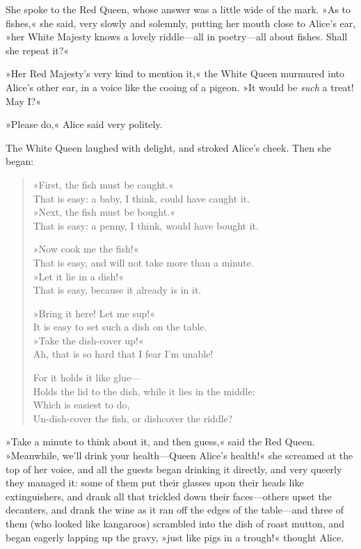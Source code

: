 She spoke to the Red Queen, whose answer was a little wide of the mark. »As to fishes,« she said, very slowly and solemnly, putting her mouth close to Alice's ear, »her White Majesty knows a lovely riddle—all in poetry—all about fishes. Shall she repeat it?«

»Her Red Majesty's very kind to mention it,« the White Queen murmured into Alice's other ear, in a voice like the cooing of a pigeon. »It would be \textit{such} a treat! May I?«

»Please do,« Alice said very politely.

The White Queen laughed with delight, and stroked Alice's cheek. Then she began:

\begin{verse}
»First, the fish must be caught.«\\
\vin That is easy: a baby, I think, could have caught it.\\
»Next, the fish must be bought.«\\
\vin That is easy: a penny, I think, would have bought it.

»Now cook me the fish!«\\
\vin That is easy, and will not take more than a minute.\\
»Let it lie in a dish!«\\
\vin That is easy, because it already is in it.

»Bring it here! Let me sup!«\\
\vin It is easy to set such a dish on the table.\\
»Take the dish-cover up!«\\
\vin Ah, that is so hard that I fear I'm unable!

For it holds it like glue—\\
\vin Holds the lid to the dish, while it lies in the middle:\\
Which is easiest to do,\\
\vin Un-dish-cover the fish, or dishcover the riddle?
\end{verse}

»Take a minute to think about it, and then guess,« said the Red Queen. »Meanwhile, we'll drink your health—Queen Alice's health!« she screamed at the top of her voice, and all the guests began drinking it directly, and very queerly they managed it: some of them put their glasses upon their heads like extinguishers, and drank all that trickled down their faces—others upset the decanters, and drank the wine as it ran off the edges of the table—and three of them (who looked like kangaroos) scrambled into the dish of roast mutton, and began eagerly lapping up the gravy, »just like pigs in a trough!« thought Alice.

